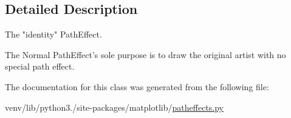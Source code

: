 \subsection{Detailed Description}
\begin{DoxyVerb}The "identity" PathEffect.

The Normal PathEffect's sole purpose is to draw the original artist with
no special path effect.
\end{DoxyVerb}
 

The documentation for this class was generated from the following file\+:\begin{DoxyCompactItemize}
\item 
venv/lib/python3./site-\/packages/matplotlib/\hyperlink{patheffects_8py}{patheffects.\+py}\end{DoxyCompactItemize}

